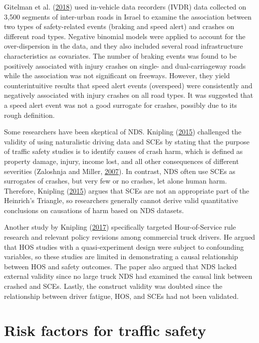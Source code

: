 \documentclass[12pt]{book}
\numberwithin{equation}{chapter}
\begin{document}
Gitelman et al. (\protect\hyperlink{ref-gitelman2018exploring}{2018}) used in-vehicle data recorders (IVDR) data collected on 3,500 segments of inter-urban roads in Israel to examine the association between two types of safety-related events (braking and speed alert) and crashes on different road types. Negative binomial models were applied to account for the over-dispersion in the data, and they also included several road infrastructure characteristics as covariates. The number of braking events was found to be positively associated with injury crashes on single- and dual-carriageway roads while the association was not significant on freeways. However, they yield counterintuitive results that speed alert events (overspeed) were consistently and negatively associated with injury crashes on all road types. It was suggested that a speed alert event was not a good surrogate for crashes, possibly due to its rough definition.

Some researchers have been skeptical of NDS. Knipling (\protect\hyperlink{ref-knipling2015naturalistic}{2015}) challenged the validity of using naturalistic driving data and SCEs by stating that the purpose of traffic safety studies is to identify causes of crash harm, which is defined as property damage, injury, income lost, and all other consequences of different severities (Zaloshnja and Miller, \protect\hyperlink{ref-zaloshnja2007unit}{2007}). In contrast, NDS often use SCEs as surrogates of crashes, but very few or no crashes, let alone human harm. Therefore, Knipling (\protect\hyperlink{ref-knipling2015naturalistic}{2015}) argues that SCEs are not an appropriate part of the Heinrich's Triangle, so researchers generally cannot derive valid quantitative conclusions on causations of harm based on NDS datasets.

Another study by Knipling (\protect\hyperlink{ref-knipling2017threats}{2017}) specifically targeted Hour-of-Service rule research and relevant policy revisions among commercial truck drivers. He argued that HOS studies with a quasi-experiment design were subject to confounding variables, so these studies are limited in demonstrating a causal relationship between HOS and safety outcomes. The paper also argued that NDS lacked external validity since no large truck NDS had examined the causal link between crashed and SCEs. Lastly, the construct validity was doubted since the relationship between driver fatigue, HOS, and SCEs had not been validated.

\hypertarget{risk-factors-for-traffic-safety}{%
\section{Risk factors for traffic safety}\label{risk-factors-for-traffic-safety}}
\end{document}
